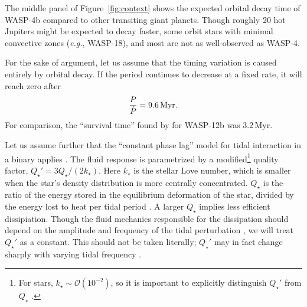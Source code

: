 \documentclass[12pt,twocolumn,tighten]{aastex62}
\begin{document}
The middle panel of Figure~\ref{fig:context} shows the expected
orbital decay time of WASP-4b compared to other transiting giant
planets.  Though roughly 20 hot Jupiters might be expected to decay
faster, some orbit stars with minimal convective zones ({\it e.g.},
WASP-18), and most are not as well-observed as WASP-4.

For the sake of argument, let us assume that the timing variation is
caused entirely by orbital decay.  If the period continues to decrease
at a fixed rate, it will reach zero after
\begin{equation}
  \frac{P}{ \dot{P} } = 9.6 \, {\rm Myr}.
\end{equation}
For comparison, the ``survival time'' found by \citet{patra_2017} for
WASP-12b was 3.2\,Myr.

Let us assume further that the ``constant phase lag'' model for tidal
interaction in a binary applies \citep{zahn_tidal_1977}.  The fluid
response is parametrized by a modified\footnote{For stars, $k_\star
\sim \mathcal{O}(10^{-2})$, so it is important to explicitly
distinguish $Q_\star'$ from $Q_\star$ \citep[{\it
e.g.},][]{schwarzschild_structure_1958}.} quality factor, $Q_\star' =
3 Q_\star / (2k_\star)$.  Here $k_\star$ is the stellar Love number,
which is smaller when the star's density distribution is more
centrally concentrated. $Q_\star$ is the ratio of the energy stored in
the equilibrium deformation of the star, divided by the energy lost to
heat per tidal period \citep[{\it e.g.},][]{goldreich_q_1966}.  A
larger $Q_\star$ implies less efficient dissipiation.  Though the
fluid mechanics responsible for the dissipation should depend on the
amplitude and frequency of the tidal perturbation
\citep[][Section~3.3]{ogilvie_tidal_2014}, we will treat $Q_\star'$ as
a constant.  This should not be taken literally; $Q_\star'$ may in
fact change sharply with varying tidal frequency
\citep{penev_empirical_2018}.
\end{document}
